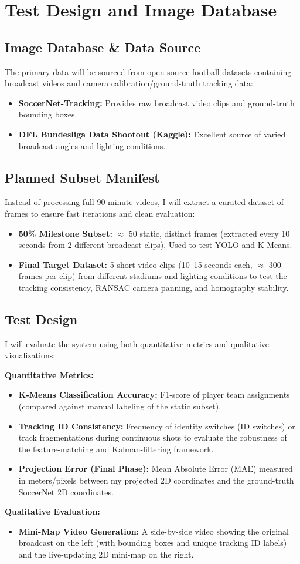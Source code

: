 \documentclass[11pt]{article}
\begin{document}
\section{Test Design and Image Database}

\subsection{Image Database \& Data Source}
The primary data will be sourced from open-source football datasets containing broadcast videos and camera calibration/ground-truth tracking data:
\begin{itemize}[leftmargin=*]
    \item \textbf{SoccerNet-Tracking:} Provides raw broadcast video clips and ground-truth bounding boxes.
    \item \textbf{DFL Bundesliga Data Shootout (Kaggle):} Excellent source of varied broadcast angles and lighting conditions.
\end{itemize}

\subsection{Planned Subset Manifest}
Instead of processing full 90-minute videos, I will extract a curated dataset of frames to ensure fast iterations and clean evaluation:
\begin{itemize}[leftmargin=*]
    \item \textbf{50\% Milestone Subset:} $\approx$ 50 static, distinct frames (extracted every 10 seconds from 2 different broadcast clips). Used to test YOLO and K-Means.
    \item \textbf{Final Target Dataset:} 5 short video clips (10--15 seconds each, $\approx$ 300 frames per clip) from different stadiums and lighting conditions to test the tracking consistency, RANSAC camera panning, and homography stability.
\end{itemize}

\subsection{Test Design}
I will evaluate the system using both quantitative metrics and qualitative visualizations:

\textbf{Quantitative Metrics:}
\begin{itemize}[leftmargin=*]
    \item \textbf{K-Means Classification Accuracy:} F1-score of player team assignments (compared against manual labeling of the static subset).
    \item \textbf{Tracking ID Consistency:} Frequency of identity switches (ID switches) or track fragmentations during continuous shots to evaluate the robustness of the feature-matching and Kalman-filtering framework.
    \item \textbf{Projection Error (Final Phase):} Mean Absolute Error (MAE) measured in meters/pixels between my projected 2D coordinates and the ground-truth SoccerNet 2D coordinates.
\end{itemize}

\textbf{Qualitative Evaluation:}
\begin{itemize}[leftmargin=*]
    \item \textbf{Mini-Map Video Generation:} A side-by-side video showing the original broadcast on the left (with bounding boxes and unique tracking ID labels) and the live-updating 2D mini-map on the right.
\end{itemize}
\end{document}
